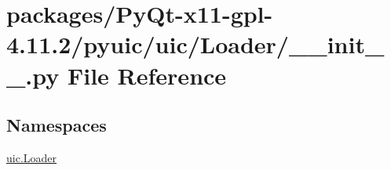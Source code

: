 \hypertarget{packages_2PyQt-x11-gpl-4_811_82_2pyuic_2uic_2Loader_2____init_____8py}{}\section{packages/\+Py\+Qt-\/x11-\/gpl-\/4.11.2/pyuic/uic/\+Loader/\+\_\+\+\_\+init\+\_\+\+\_\+.py File Reference}
\label{packages_2PyQt-x11-gpl-4_811_82_2pyuic_2uic_2Loader_2____init_____8py}
\subsection*{Namespaces}
\begin{DoxyCompactItemize}
\item 
 \hyperlink{namespaceuic_1_1Loader}{uic.\+Loader}
\end{DoxyCompactItemize}
